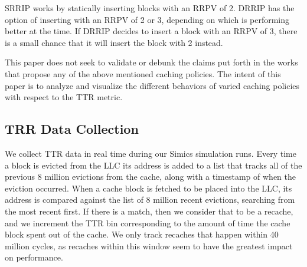 SRRIP works by statically inserting blocks with an RRPV of 2.  DRRIP
has the option of inserting with an RRPV of 2 or 3, depending on which
is performing better at the time.  If DRRIP decides to insert a block
with an RRPV of 3, there is a small chance that it will insert the
block with 2 instead.

This paper does not seek to validate or debunk the claims put forth in
the works that propose any of the above mentioned caching policies.
The intent of this paper is to analyze and visualize the different
behaviors of varied caching policies with respect to the TTR metric. 

\subsection{TRR Data Collection}

We collect TTR data in real time during our Simics simulation runs.
Every time a block is evicted from the LLC its address is added to a
list that tracks all of the previous 8 million evictions from the
cache, along with a timestamp of when the eviction occurred. 
When a cache block is fetched to be placed into the LLC, its address
is compared against the list of 8 million recent evictions, searching
from the most recent first.  If there
is a match, then we consider that to be a recache, and we increment
the TTR bin corresponding to the amount of time the cache block spent
out of the cache.  We only track recaches that happen within 40
million cycles, as recaches within this window seem to have the
greatest impact on performance.
